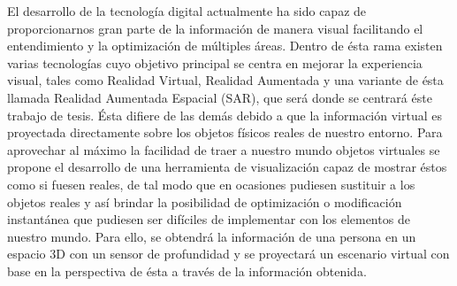 \documentclass[a4paper,openright,12pt]{report}
\begin{document}
El desarrollo de la tecnología digital actualmente ha sido capaz de proporcionarnos gran parte de la información de manera visual facilitando el entendimiento y la optimización de múltiples áreas. Dentro de ésta rama existen varias tecnologías cuyo objetivo principal se centra en mejorar la experiencia visual, tales como Realidad Virtual, Realidad Aumentada y una variante de ésta llamada Realidad Aumentada Espacial (SAR), que será donde se centrará éste trabajo de tesis. Ésta difiere de las demás debido a que la información virtual es proyectada directamente sobre los objetos físicos reales de nuestro entorno. Para aprovechar al máximo la facilidad de traer a nuestro mundo objetos virtuales se propone el desarrollo de una herramienta de visualización capaz de mostrar éstos como si fuesen reales, de tal modo que en ocasiones pudiesen sustituir a los objetos reales y así brindar la posibilidad de optimización o modificación instantánea que pudiesen ser difíciles de implementar con los elementos de nuestro mundo. Para ello, se obtendrá la información de una persona en un espacio 3D con un sensor de profundidad y se proyectará un escenario virtual con base en la perspectiva de ésta a través de la información obtenida.


\tableofcontents
\cleardoublepage
{}
\listoffigures
\cleardoublepage
{}
\listoftables

\cleardoublepage
\end{document}
